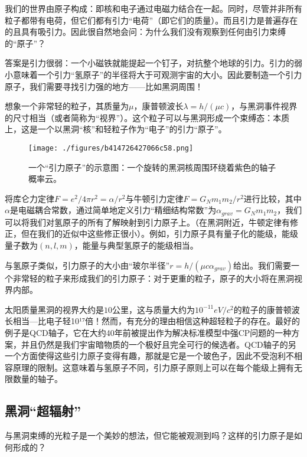 
我们的世界由原子构成：即核和电子通过电磁力结合在一起。同时，尽管并非所有粒子都带有电荷，但它们都有引力“电荷”（即它们的质量）。而且引力是普遍存在的且具有吸引力。因此很自然地会问：为什么我们没有观察到任何由引力束缚的“原子”？

答案是引力很弱：一个小磁铁就能提起一个钉子，对抗整个地球的引力。引力的弱小意味着一个引力“氢原子”的半径将大于可观测宇宙的大小。因此要制造一个引力原子，我们需要寻找引力强的地方——比如黑洞周围！

想象一个非常轻的粒子，其质量为$\mu$，康普顿波长$\lambda = h / (\mu c)$，与黑洞事件视界的尺寸相当（或者简称为“视界”）。这个粒子可以与黑洞形成一个束缚态：本质上，这是一个以黑洞“核”和轻粒子作为“电子”的引力“原子”。

\begin{figure}[ht]
\centering
\texttt{[image: ./figures/b414726427066c58.png]}
\caption{一个“引力原子”的示意图：一个旋转的黑洞核周围环绕着紫色的轴子概率云。} \label{fig_GAtom_1}
\end{figure}

将库仑力定律$F = e^2 / 4\pi r^2 = \alpha / r^2$与牛顿引力定律$F = G_N m_1 m_2 / r^2$进行比较，其中$\alpha$是电磁耦合常数，通过简单地定义引力“精细结构常数”为$\alpha_{grav} = G_N m_1 m_2$，我们可以将我们对氢原子的所有了解映射到引力原子上。（在黑洞附近，牛顿定律有修正，但在我们的近似中这些修正很小）。例如，引力原子具有量子化的能级，能级量子数为$(n, l, m)$，能量与典型氢原子的能级相当。

与氢原子类似，引力原子的大小由“玻尔半径”$r = h / (\mu c \alpha_{grav})$给出。我们需要一个非常轻的粒子来形成我们的引力原子：对于更重的粒子，原子的大小将在黑洞视界内部。

太阳质量黑洞的视界大约是$10$公里，这与质量大约为$10^{-11} eV/c^2$的粒子的康普顿波长相当—比电子轻10¹⁷倍！然而，有充分的理由相信这种超轻粒子的存在。最好的例子是QCD轴子，它在大约40年前被提出作为解决标准模型中强CP问题的一种方案，并且仍然是我们宇宙暗物质的一个极好且完全可行的候选者。QCD轴子的另一个方面使得这些引力原子变得有趣，那就是它是一个玻色子，因此不受泡利不相容原理的限制。这意味着与氢原子不同，引力原子原则上可以在每个能级上拥有无限数量的轴子。

\subsection{黑洞“超辐射”}

与黑洞束缚的光粒子是一个美妙的想法，但它能被观测到吗？这样的引力原子是如何形成的？

